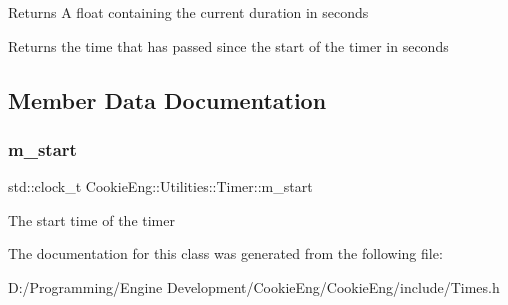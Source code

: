 \begin{DoxyReturn}{Returns}
A float containing the current duration in seconds
\end{DoxyReturn}
Returns the time that has passed since the start of the timer in seconds 

\subsection{Member Data Documentation}
\mbox{\label{class_cookie_eng_1_1_utilities_1_1_timer_a49ae24086217a500de80980bb6e9c121}} 
\subsubsection{\texorpdfstring{m\+\_\+start}{m\_start}}
{\footnotesize\ttfamily std\+::clock\+\_\+t Cookie\+Eng\+::\+Utilities\+::\+Timer\+::m\+\_\+start\hspace{0.3cm}{\ttfamily [protected]}}

The start time of the timer 

The documentation for this class was generated from the following file\+:\begin{DoxyCompactItemize}
\item 
D\+:/\+Programming/\+Engine Development/\+Cookie\+Eng/\+Cookie\+Eng/include/Times.\+h\end{DoxyCompactItemize}
